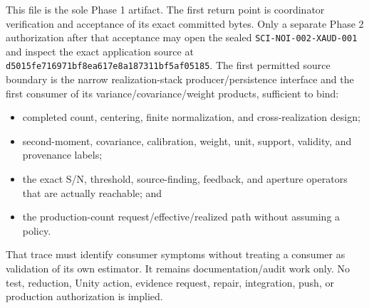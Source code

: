 \documentclass[11pt]{article}
\begin{document}
This file is the sole Phase 1 artifact.  The first return point is coordinator
verification and acceptance of its exact committed bytes.  Only a separate
Phase 2 authorization after that acceptance may open the sealed
\texttt{SCI-NOI-002-XAUD-001} and inspect the exact application source at
\texttt{d5015fe716971bf8ea617e8a187311bf5af05185}.  The first permitted source
boundary is the narrow realization-stack producer/persistence interface and
the first consumer of its variance/covariance/weight products, sufficient to
bind:
\begin{itemize}
\item completed count, centering, finite normalization, and cross-realization
design;
\item second-moment, covariance, calibration, weight, unit, support, validity,
and provenance labels;
\item the exact S/N, threshold, source-finding, feedback, and aperture
operators that are actually reachable; and
\item the production-count request/effective/realized path without assuming a
policy.
\end{itemize}
That trace must identify consumer symptoms without treating a consumer as
validation of its own estimator.  It remains documentation/audit work only.
No test, reduction, Unity action, evidence request, repair, integration, push,
or production authorization is implied.
\end{document}
